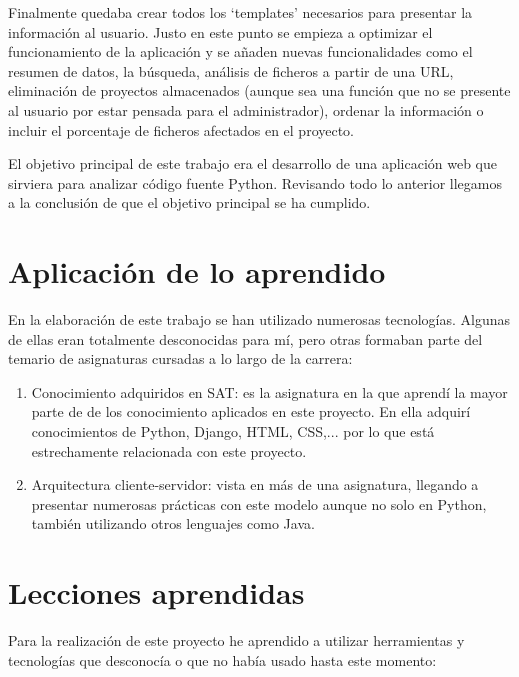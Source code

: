 \documentclass[a4paper, 12pt]{book}
\begin{document}
Finalmente quedaba crear todos los `templates' necesarios para presentar la información al usuario. Justo en este punto se empieza a optimizar el funcionamiento de la aplicación y se añaden nuevas funcionalidades como el resumen de datos, la búsqueda, análisis de ficheros a partir de una URL, eliminación de proyectos almacenados (aunque sea una función que no se presente al usuario por estar pensada para el administrador), ordenar la información o incluir el porcentaje de ficheros afectados en el proyecto.

El objetivo principal de este trabajo era el desarrollo de una aplicación web que sirviera para analizar código fuente Python. Revisando todo lo anterior llegamos a la conclusión de que el objetivo principal se ha cumplido.

\section{Aplicación de lo aprendido}
\label{sec:aplicacion}
En la elaboración de este trabajo se han utilizado numerosas tecnologías. Algunas de ellas eran totalmente desconocidas para mí, pero otras formaban parte del temario de asignaturas cursadas a lo largo de la carrera:

\begin{enumerate}
  \item Conocimiento adquiridos en SAT: es la asignatura en la que aprendí la mayor parte de de los conocimiento aplicados en este proyecto. En ella adquirí conocimientos de Python, Django, HTML, CSS,... por lo que está estrechamente relacionada con este proyecto.
  \item Arquitectura cliente-servidor: vista en más de una asignatura, llegando a presentar numerosas prácticas con este modelo aunque no solo en Python, también utilizando otros lenguajes como Java.
\end{enumerate}


\section{Lecciones aprendidas}
\label{sec:lecciones_aprendidas}
Para la realización de este proyecto he aprendido a utilizar herramientas y tecnologías que desconocía o que no había usado hasta este momento:
\end{document}
